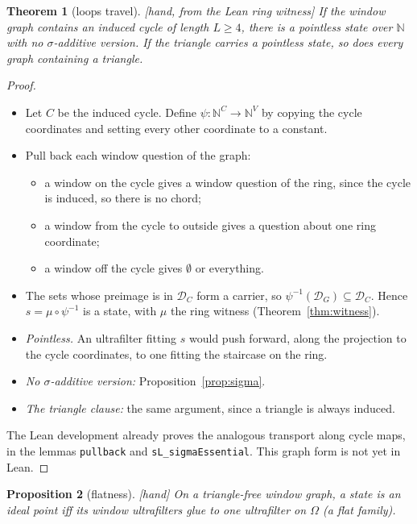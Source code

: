 \documentclass[11pt]{article}
\theoremstyle{plain}
\newtheorem{theorem}{Theorem}[section]
\newtheorem{proposition}[theorem]{Proposition}
\theoremstyle{definition}
\newcommand{\bbN}{\mathbb{N}}
\newcommand{\cD}{\mathcal{D}}
\newcommand{\st}[1]{\textsf{\small[#1]}}
\begin{document}
\begin{theorem}[loops travel]\label{thm:travel}\st{hand, from the Lean ring witness}
If the window graph contains an induced cycle of length $L\ge4$, there is a
pointless state over $\bbN$ with no $\sigma$-additive version. If the triangle
carries a pointless state, so does every graph containing a triangle.
\end{theorem}
\begin{proof}
\begin{itemize}[nosep]
  \item Let $C$ be the induced cycle. Define $\psi:\bbN^C\to\bbN^V$ by copying the
    cycle coordinates and setting every other coordinate to a constant.
  \item Pull back each window question of the graph:
    \begin{itemize}[nosep]
      \item a window on the cycle gives a window question of the ring, since
        the cycle is induced, so there is no chord;
      \item a window from the cycle to outside gives a question about one ring
        coordinate;
      \item a window off the cycle gives $\emptyset$ or everything.
    \end{itemize}
  \item The sets whose preimage is in $\cD_C$ form a carrier, so
    $\psi^{-1}(\cD_G)\subseteq\cD_C$. Hence $s=\mu\circ\psi^{-1}$ is a state, with
    $\mu$ the ring witness (Theorem~\ref{thm:witness}).
  \item \emph{Pointless.} An ultrafilter fitting $s$ would push forward, along
    the projection to the cycle coordinates, to one fitting the staircase on the
    ring.
  \item \emph{No $\sigma$-additive version:} Proposition~\ref{prop:sigma}.
  \item \emph{The triangle clause:} the same argument, since a triangle is
    always induced.
\end{itemize}
The Lean development already proves the analogous transport along cycle
maps, in the lemmas \texttt{pullback} and \texttt{sL\_sigmaEssential}. This
graph form is not yet in Lean.
\end{proof}

\begin{proposition}[flatness]\label{prop:flat}\st{hand}
On a triangle-free window graph, a state is an ideal point iff its
window ultrafilters glue to one ultrafilter on $\Omega$ (a flat family).
\end{proposition}
\end{document}
